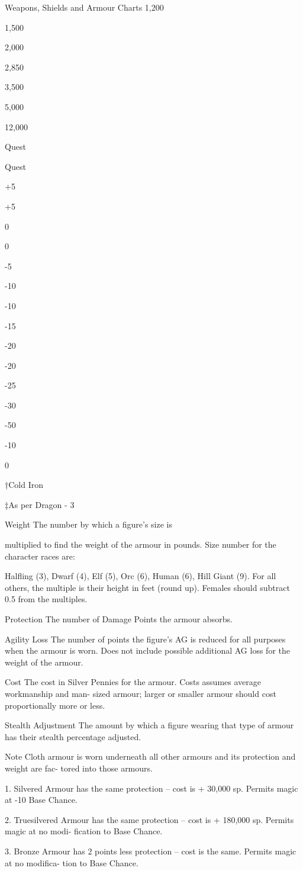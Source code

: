 \begin{Table}{Weapons, Shields and Armour Charts}
1,200 

1,500 

2,000 

2,850 

3,500 

5,000 

12,000 

Quest 

Quest 

+5 

+5 

0 

0 

-5 

-10 

-10 

-15 

-20 

-20 

-25 

-30 

-50 

-10 

0 

†Cold Iron  

‡As per Dragon - 3 

 
Weight  The  number  by  which  a  figure’s  size  is 
 
multiplied  to  find  the  weight  of  the  armour  in 
pounds. Size number for the character races are: 
 
Halfling (3), Dwarf (4), Elf (5), Orc (6), Human 
(6), Hill Giant (9). For all others, the multiple is 
their  height  in  feet  (round  up).  Females  should 
subtract 0.5 from the multiples. 

 

Protection  The  number  of  Damage  Points  the 
armour absorbs. 

Agility  Loss  The  number  of  points  the  figure’s 
AG is reduced for all purposes when the armour 
is worn. Does not include possible additional AG 
loss for the weight of the armour. 

Cost  The  cost  in  Silver  Pennies  for  the  armour. 
Costs  assumes  average  workmanship  and  man-
sized  armour;  larger  or  smaller  armour  should 
cost proportionally more or less. 

Stealth  Adjustment  The  amount  by  which  a 
figure  wearing  that  type  of  armour  has  their 
stealth percentage adjusted. 

Note  Cloth  armour  is  worn  underneath  all  other 
armours  and  its  protection  and  weight  are  fac-
tored into those armours. 

1.  Silvered  Armour  has  the  same  protection  – 
cost  is  +  30,000  sp.  Permits  magic  at  -10%
Base Chance. 

2.  Truesilvered  Armour  has  the  same  protection 
– cost is + 180,000 sp. Permits magic at no modi-
fication to Base Chance. 

3. Bronze  Armour  has 2 points  less  protection – 
cost  is  the  same.  Permits  magic  at  no  modifica-
tion to Base Chance. 

\end{Table}
